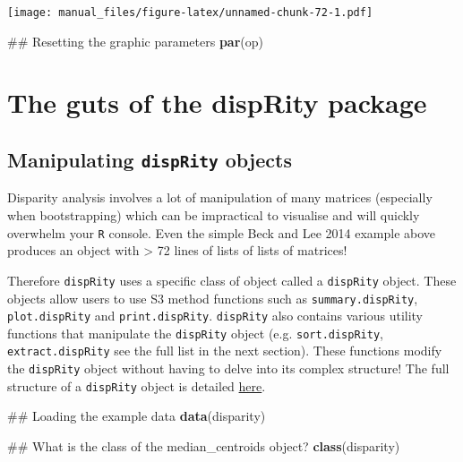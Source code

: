 \documentclass[]{book}
\newenvironment{Shaded}{\begin{snugshade}}{\end{snugshade}}
\newcommand{\KeywordTok}[1]{\textcolor[rgb]{0.13,0.29,0.53}{\textbf{#1}}}
\newcommand{\NormalTok}[1]{#1}
\theoremstyle{definition}
\theoremstyle{definition}
\theoremstyle{remark}
\begin{document}
\texttt{[image: manual\_files/figure-latex/unnamed-chunk-72-1.pdf]}

\begin{Shaded}
\begin{Highlighting}[]
\NormalTok{## Resetting the graphic parameters}
\KeywordTok{par}\NormalTok{(op)}
\end{Highlighting}
\end{Shaded}

\chapter{The guts of the dispRity
package}\label{the-guts-of-the-disprity-package}

\section{\texorpdfstring{Manipulating \texttt{dispRity}
objects}{Manipulating dispRity objects}}\label{manipulating-disprity-objects}

Disparity analysis involves a lot of manipulation of many matrices
(especially when bootstrapping) which can be impractical to visualise
and will quickly overwhelm your \texttt{R} console. Even the simple Beck
and Lee 2014 example above produces an object with \textgreater{} 72
lines of lists of lists of matrices!

Therefore \texttt{dispRity} uses a specific class of object called a
\texttt{dispRity} object. These objects allow users to use S3 method
functions such as \texttt{summary.dispRity}, \texttt{plot.dispRity} and
\texttt{print.dispRity}. \texttt{dispRity} also contains various utility
functions that manipulate the \texttt{dispRity} object (e.g.
\texttt{sort.dispRity}, \texttt{extract.dispRity} see the full list in
the next section). These functions modify the \texttt{dispRity} object
without having to delve into its complex structure! The full structure
of a \texttt{dispRity} object is detailed
\href{https://github.com/TGuillerme/dispRity/blob/master/disparity_object.md}{here}.

\begin{Shaded}
\begin{Highlighting}[]
\NormalTok{## Loading the example data}
\KeywordTok{data}\NormalTok{(disparity)}

\NormalTok{## What is the class of the median_centroids object?}
\KeywordTok{class}\NormalTok{(disparity)}
\end{Highlighting}
\end{Shaded}
\end{document}
